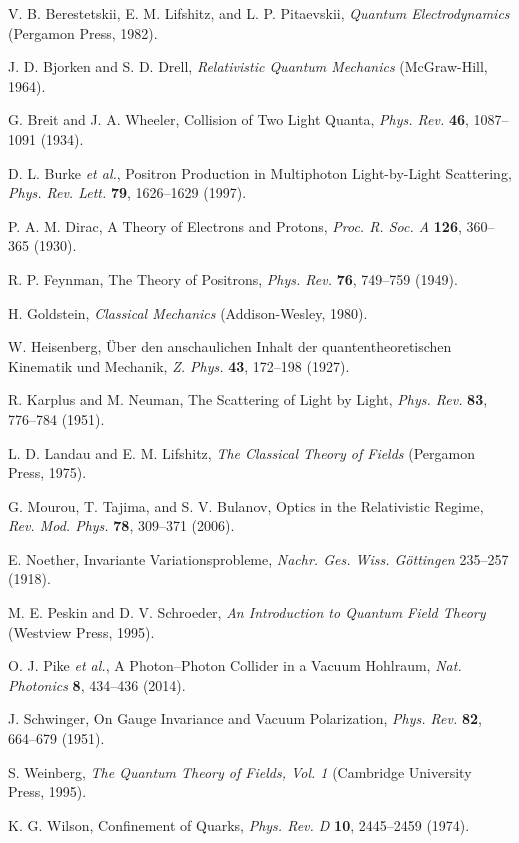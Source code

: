 \documentclass[aps,prl,twocolumn,superscriptaddress]{revtex4-2}
\begin{document}
	
	\begin{thebibliography}{}
		
		V. B. Berestetskii, E. M. Lifshitz, and L. P. Pitaevskii, \emph{Quantum Electrodynamics} (Pergamon Press, 1982).
		
		J. D. Bjorken and S. D. Drell, \emph{Relativistic Quantum Mechanics} (McGraw-Hill, 1964).
		
		G. Breit and J. A. Wheeler, Collision of Two Light Quanta, \emph{Phys. Rev.} \textbf{46}, 1087--1091 (1934).
		
		D. L. Burke \emph{et al.}, Positron Production in Multiphoton Light-by-Light Scattering, \emph{Phys. Rev. Lett.} \textbf{79}, 1626--1629 (1997).
		
		P. A. M. Dirac, A Theory of Electrons and Protons, \emph{Proc. R. Soc. A} \textbf{126}, 360--365 (1930).
		
		R. P. Feynman, The Theory of Positrons, \emph{Phys. Rev.} \textbf{76}, 749--759 (1949).
		
		H. Goldstein, \emph{Classical Mechanics} (Addison-Wesley, 1980).
		
		W. Heisenberg, Über den anschaulichen Inhalt der quantentheoretischen Kinematik und Mechanik, \emph{Z. Phys.} \textbf{43}, 172--198 (1927).
		
		R. Karplus and M. Neuman, The Scattering of Light by Light, \emph{Phys. Rev.} \textbf{83}, 776--784 (1951).
		
		L. D. Landau and E. M. Lifshitz, \emph{The Classical Theory of Fields} (Pergamon Press, 1975).
		
		G. Mourou, T. Tajima, and S. V. Bulanov, Optics in the Relativistic Regime, \emph{Rev. Mod. Phys.} \textbf{78}, 309--371 (2006).
		
		E. Noether, Invariante Variationsprobleme, \emph{Nachr. Ges. Wiss. Göttingen} 235--257 (1918).
		
		M. E. Peskin and D. V. Schroeder, \emph{An Introduction to Quantum Field Theory} (Westview Press, 1995).
		
		O. J. Pike \emph{et al.}, A Photon–Photon Collider in a Vacuum Hohlraum, \emph{Nat. Photonics} \textbf{8}, 434--436 (2014).
		
		J. Schwinger, On Gauge Invariance and Vacuum Polarization, \emph{Phys. Rev.} \textbf{82}, 664--679 (1951).
		
		S. Weinberg, \emph{The Quantum Theory of Fields, Vol. 1} (Cambridge University Press, 1995).
		
		K. G. Wilson, Confinement of Quarks, \emph{Phys. Rev. D} \textbf{10}, 2445--2459 (1974).
		
	\end{thebibliography}
	
\end{document}
